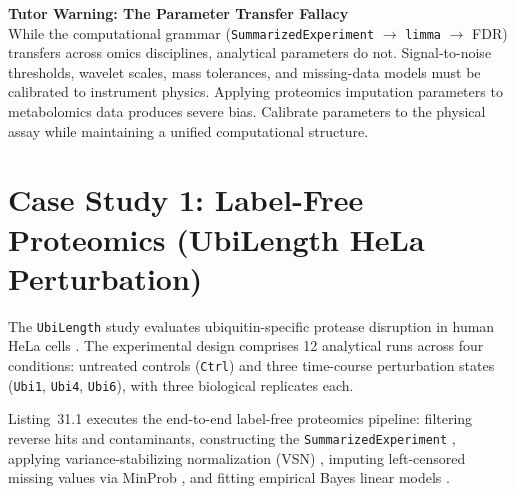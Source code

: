 \documentclass[11pt,twoside,openright]{book}
\begin{document}
\begin{notebox}
\textbf{Tutor Warning: The Parameter Transfer Fallacy}\\[0.4em]
While the computational grammar (\texttt{SummarizedExperiment} $\to$ \texttt{limma} $\to$ FDR) transfers across omics disciplines, analytical parameters do not. Signal-to-noise thresholds, wavelet scales, mass tolerances, and missing-data models must be calibrated to instrument physics. Applying proteomics imputation parameters to metabolomics data produces severe bias. Calibrate parameters to the physical assay while maintaining a unified computational structure.
\end{notebox}

\FloatBarrier
\section{Case Study 1: Label-Free Proteomics (UbiLength HeLa Perturbation)}
\label{sec:case_study_proteomics}

The \texttt{UbiLength} study evaluates ubiquitin-specific protease disruption in human HeLa cells \cite{zhang2017ubilength, zhang2018dep}. The experimental design comprises 12 analytical runs across four conditions: untreated controls (\texttt{Ctrl}) and three time-course perturbation states (\texttt{Ubi1}, \texttt{Ubi4}, \texttt{Ubi6}), with three biological replicates each.

Listing~31.1 executes the end-to-end label-free proteomics pipeline: filtering reverse hits and contaminants, constructing the \texttt{SummarizedExperiment} \cite{huber2015orchestrating}, applying variance-stabilizing normalization (VSN) \cite{huber2002vsn}, imputing left-censored missing values via MinProb \cite{lazar2016accounting}, and fitting empirical Bayes linear models \cite{smyth2004limma}.
\end{document}
